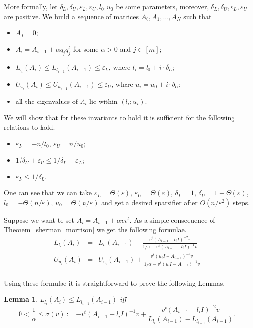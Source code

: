 \documentclass[12pt]{article}
\newcommand{\eps}{\varepsilon}
\newtheorem{lemma}{Lemma}
\begin{document}
    More formally, let $\delta_L, \delta_U, \eps_L, \eps_U, l_0, u_0$ be some parameters, moreover,
    $\delta_L, \delta_U, \eps_L, \eps_U$ are positive.
    We build a sequence of matrices $A_0, A_1, \ldots, A_N$ such that
    \begin{itemize}
        \item $A_0 = 0$;
        \item $A_i = A_{i-1} + \alpha q_j q_j^t$ for some $\alpha > 0$ and $j \in [m]$;
        \item $L_{l_i}(A_i) \leq L_{l_{i-1}}(A_{i-1}) \leq \eps_L$, where $l_i = l_0 + i \cdot \delta_L$;
        \item $U_{u_i}(A_i) \leq U_{u_{i-1}}(A_{i-1}) \leq \eps_U$, where $u_i = u_0 + i \cdot \delta_U$;
        \item all the eigenvalues of $A_i$ lie within $(l_i; u_i)$.
    \end{itemize}
    We will show that for these invariants to hold it is sufficient for the following relations to hold.
    \begin{itemize}
        \item $\eps_L = -n / l_0$, $\eps_U = n / u_0$;
        \item $1 / \delta_U + \eps_U \leq 1 / \delta_L - \eps_L$;
        \item $\eps_L \leq 1 / \delta_L$.
    \end{itemize}
    One can see that we can take $\eps_L = \Theta(\eps)$, $\eps_U = \Theta(\eps)$, $\delta_L = 1$,
    $\delta_U = 1 + \Theta(\eps)$, $l_0 = -\Theta(n / \eps)$, $u_0 = \Theta(n / \eps)$ and get a desired sparsifier
    after $O(n / \eps^2)$ steps.

    Suppose we want to set $A_i = A_{i-1} + \alpha vv^t$. As a simple consequence of Theorem~\ref{sherman_morrison} we
    get the following formulae.
    \begin{eqnarray*}
        L_{l_i}(A_i) &=& L_{l_i}(A_{i-1}) - \frac{v^t (A_{i-1} - l_iI)^{-2} v}{1 / \alpha + v^t (A_{i-1} - l_i I)^{-1} v}\\
        U_{u_i}(A_i) &=& U_{u_i}(A_{i-1}) + \frac{v^t (u_iI - A_{i-1})^{-2} v}{1 / \alpha - v^t (u_iI - A_{i-1})^{-1} v}\\
    \end{eqnarray*}

    Using these formulae it is straightforward to prove the following Lemmas.

    \begin{lemma}
        \label{lower_shift}
        $L_{l_i}(A_i) \leq L_{l_{i-1}}(A_{i-1})$ iff
        $$
            0 < \frac{1}{\alpha} \leq \sigma(v) := -v^t(A_{i-1}-l_iI)^{-1}v +
            \frac{v^t(A_{i-1}-l_iI)^{-2}v}{L_{l_i}(A_{i-1}) - L_{l_{i-1}}(A_{i-1})}.
        $$
    \end{lemma}
\end{document}
